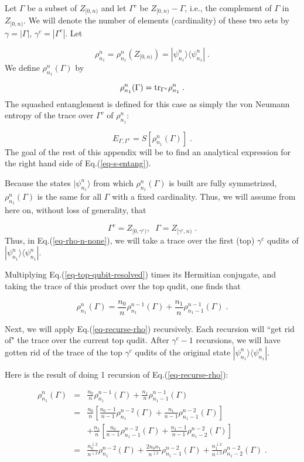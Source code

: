 \documentclass[12pt]{article}%
\newcommand{\bra}[1]{\langle#1|}
\newcommand{\ket}[1]{|#1\rangle}
\newcommand{\tr}[0]{{\rm tr }}
\newcommand{\beq}{\begin{equation}}
\newcommand{\eeq}{\end{equation}}
\newcommand{\beqa}{\begin{eqnarray}}
\newcommand{\eeqa}{\end{eqnarray}}
\newcommand{\darrow}[0]{{\downarrow}}
\begin{document}
{Let  $\Gamma$ be a subset of
$ Z_{[0,n)}$ and let $\Gamma^c$ be
$Z_{[0,n)}-\Gamma$, i.e.,  the complement
 of
$\Gamma$ in
$ Z_{[0,n)}$.
We will denote the number of elements
(cardinality) of these two sets by
$\gamma = |\Gamma|$,
$\gamma^c = |\Gamma^c|$.
Let

\beq
\rho^n_{n_1}= \rho^n_{n_1}(Z_{[0,n)})
=
\ket{\psi^n_{n_1}}
\bra{\psi^n_{n_1}}
\;.
\eeq
We define $\rho^n_{n_1}(\Gamma)$ by

\beq
\rho^n_{n_1}(\Gamma) =
\tr_{\Gamma^c}
\rho^n_{n_1}
\;.\label{eq-rho-n-none}
\eeq
The squashed entanglement is defined
for this case as simply the von Neumann entropy
of the trace over $\Gamma^c$ of $\rho^n_{n_1}$:

\beq
E_{\Gamma, \Gamma^c} = S[\rho^n_{n_1}(\Gamma)]
\;.
\label{eq-s-entang}
\eeq
The goal of the rest of this appendix will
be to find an analytical expression for the
right hand side of Eq.(\ref{eq-s-entang}).

Because the states
$\ket{\psi^n_{n_1}}$ from which
$\rho^n_{n_1}(\Gamma)$  is built are fully symmetrized,
$\rho^n_{n_1}(\Gamma)$ is the same for all $\Gamma$
with a fixed cardinality.
Thus,
we will assume from here on, without loss of generality, that


\beq
\Gamma^c = Z_{[0, \gamma^c)},\;\;
\Gamma = Z_{[\gamma^c, n)}
\;.
\eeq
Thus,
in Eq.(\ref{eq-rho-n-none}), we will take a
trace over the first (top) $\gamma^c$
qudits of $\ket{\psi^n_{n_1}}
\bra{\psi^n_{n_1}}$.

Multiplying Eq.(\ref{eq-top-qubit-resolved})
times its Hermitian conjugate,
and taking the trace
of this product over the top qudit,
one finds that

\beq
\rho^{n}_{n_1}(\Gamma)=
\frac{n_0}{n}\rho^{n-1}_{n_1}(\Gamma)
+
\frac{n_1}{n}\rho^{n-1}_{n_1-1}(\Gamma)
\;.
\label{eq-recurse-rho}
\eeq

Next, we will apply Eq.(\ref{eq-recurse-rho})
recursively. Each recursion will
``get rid of" the trace over the current top qudit.
After $\gamma^c-1$ recursions, we will have
gotten rid of the trace of the top
$\gamma^c$ qudits of the original
state $\ket{\psi^n_{n_1}}
\bra{\psi^n_{n_1}}$.


Here is the result of doing 1
 recursion of Eq.(\ref{eq-recurse-rho}):

\beqa
\rho^{n}_{n_1}(\Gamma)&=&
\frac{n_0}{n}\rho^{n-1}_{n_1}(\Gamma)
+
\frac{n_1}{n}\rho^{n-1}_{n_1-1}(\Gamma)
\\
&=&
\frac{n_0}{n}
\left[
\frac{n_0-1}{n-1}\rho^{n-2}_{n_1}(\Gamma)
+
\frac{n_1}{n-1}\rho^{n-2}_{n_1-1}(\Gamma)
\right]
\\
&& +
\frac{n_1}{n}
\left[
\frac{n_0}{n-1}\rho^{n-2}_{n_1-1}(\Gamma)
+
\frac{n_1-1}{n-1}\rho^{n-2}_{n_1-2}(\Gamma)
\right]
\\
&=&
\frac{n_0^{\darrow 2}}{n^{\darrow 2}}
\rho^{n-2}_{n_1}(\Gamma)
+
\frac{2n_0 n_1}{n^{\darrow 2}}
\rho^{n-2}_{n_1-1}(\Gamma)
+
\frac{n_1^{\darrow 2}}{n^{\darrow 2}}
\rho^{n-2}_{n_1-2}(\Gamma)
\;.
\eeqa

}
\end{document}
